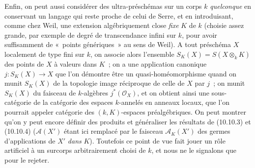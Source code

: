 
\begin{env}[10.10.5]
\label{IV.10.10.5-fr}
Enfin, on peut aussi considérer des ultra-préschémas sur un corps $k$
\emph{quelconque} en conservant un langage qui reste proche de celui de Serre, et en
introduisant, comme chez Weil, une extension algébriquement close \emph{fixe} $K$ de
$k$ (choisie assez grande, par exemple de degré de transcendance infini sur
$k$, pour avoir suffisamment de «~points génériques~» au sens de Weil). A tout
préschéma $X$ localement de type fini sur $k$, on associe alors l'ensemble
$S_K(X)=S(X\otimes_kK)$ des points de $X$ à valeurs dans $K$~; on a une
application canonique $j:S_K(X)\to X$ que l'on démontre être un
quasi-homéomorphisme quand on munit $S_K(X)$ de la topologie image réciproque
de celle de $X$ par $j$~; on munit $S_K(X)$ du faisceau de $k$-algèbres
$j^*(\mathcal O_X)$, et on obtient ainsi une sous-catégorie de la catégorie des
espaces $k$-annelés en anneaux locaux, que l'on pourrait appeler catégorie des
$(k,K)$-espaces préalgébriques. On peut montrer qu'on y peut encore définir des
produits et généraliser les résultats de (10.10.3) et (10.10.4)
($\mathcal A(X')$ étant ici remplacé par le faisceau $\mathcal A_K(X')$ des
germes d'applications de $X'$ \emph{dans} $K$). Toutefois ce point de vue fait jouer
un rôle artificiel à un surcorps arbitrairement choisi de $k$, et nous ne le
signalons que pour le rejeter.
\end{env}
